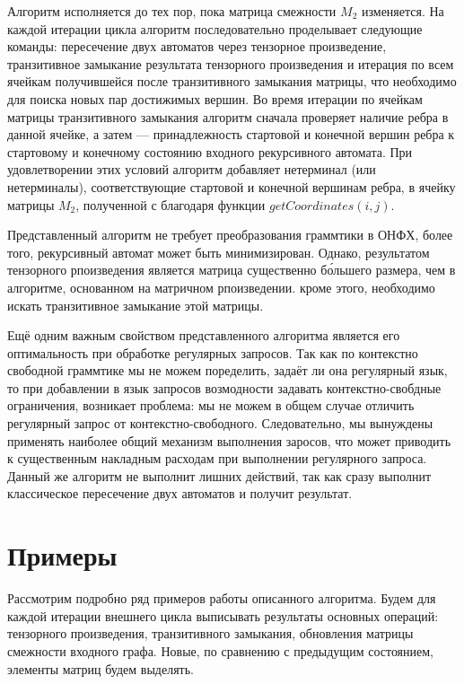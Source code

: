 Алгоритм исполняется до тех пор, пока матрица смежности $M_2$ изменяется.
На каждой итерации цикла алгоритм последовательно проделывает следующие команды: пересечение двух автоматов через тензорное произведение, транзитивное замыкание результата тензорного произведения и итерация по всем ячейкам получившейся после транзитивного замыкания матрицы, что необходимо для поиска новых пар достижимых вершин.
Во время итерации по ячейкам матрицы транзитивного замыкания алгоритм сначала проверяет наличие ребра в данной ячейке, а затем --- принадлежность стартовой и конечной вершин ребра к стартовому и конечному состоянию входного рекурсивного автомата.
При удовлетворении этих условий алгоритм добавляет нетерминал (или нетерминалы), соответствующие стартовой и конечной вершинам ребра, в ячейку матрицы $M_2$, полученной с благодаря функции $getCoordinates(i,j)$.

Представленный алгоритм не требует преобразования граммтики в ОНФХ, более того, рекурсивный автомат может быть минимизирован. Однако, результатом тензорного рпоизведения является матрица существенно б\'{о}льшего размера, чем в алгоритме, основанном на матричном рпоизведении. кроме этого, необходимо искать транзитивное замыкание этой матрицы.

Ещё одним важным свойством представленного алгоритма является его оптимальность при обработке регулярных запросов. Так как по контекстно свободной граммтике мы не можем поределить, задаёт ли она регулярный язык, то при добавлении в язык запросов возмодности задавать контекстно-свобдные ограничения, возникает проблема: мы не можем в общем случае отличить регулярный запрос от контекстно-свободного. Следовательно, мы вынуждены применять наиболее общий механизм выполнения заросов, что может приводить к существенным накладным расходам при выполнении регулярного запроса. Данный же алгоритм не выполнит лишних действий, так как сразу выполнит классическое пересечение двух автоматов и получит результат.

\section{Примеры}

Рассмотрим подробно ряд примеров работы описанного алгоритма.
Будем для каждой итерации внешнего цикла выписывать результаты основных операций: тензорного произведения, транзитивного замыкания, обновления матрицы смежности входного графа.
Новые, по сравнению с предыдущим состоянием, элементы матриц будем выделять.

